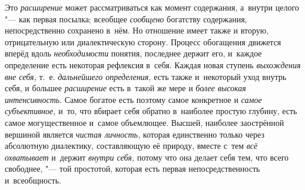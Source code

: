 Это {\em расширение} может рассматриваться как момент содержания, а~внутри
целого "--- как первая посылка; всеобщее {\em сообщено} богатству
содержания, непосредственно сохранено в~нём. Но отношение имеет также и
вторую, отрицательную или диалектическую сторону. Процесс обогащения
движется вперёд вдоль {\em необходимости}
понятия, последнее держит его, и~каждое определение есть
некоторая рефлексия в~себя. Каждая новая ступень
{\em выхождения вне себя,} т.~е. {\em дальнейшего
определения,} есть также и~некоторый уход внутрь себя, и
большее {\em расширение} есть в~такой же мере и
{\em более высокая интенсивность}.
Самое богатое есть поэтому самое конкретное и {\em самое субъективное,}
и~то, что вбирает себя обратно в~наиболее простую глубину,
есть самое могущественное и~самое объемлющее. Высшей, наиболее заострённой
вершиной является {\em чистая
личность,} которая единственно только через абсолютную
диалектику, составляющую её природу, вместе с~тем
{\em всё охватывает} и~держит {\em внутри себя,}
потому что она делает себя тем, что всего свободнее, "---
той простотой, которая есть первая непосредственность и~всеобщность.

